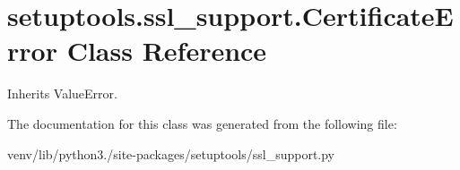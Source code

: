 \hypertarget{classsetuptools_1_1ssl__support_1_1_certificate_error}{}\section{setuptools.\+ssl\+\_\+support.\+Certificate\+Error Class Reference}
\label{classsetuptools_1_1ssl__support_1_1_certificate_error}


Inherits Value\+Error.



The documentation for this class was generated from the following file\+:\begin{DoxyCompactItemize}
\item 
venv/lib/python3./site-\/packages/setuptools/ssl\+\_\+support.\+py\end{DoxyCompactItemize}
